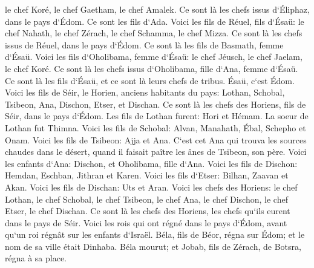 \verse le chef Koré, le chef Gaetham, le chef Amalek. Ce sont là les chefs issus d`Éliphaz, dans le pays d`Édom. Ce sont les fils d`Ada. 
\verse Voici les fils de Réuel, fils d`Ésaü: le chef Nahath, le chef Zérach, le chef Schamma, le chef Mizza. Ce sont là les chefs issus de Réuel, dans le pays d`Édom. Ce sont là les fils de Basmath, femme d`Ésaü. 
\verse Voici les fils d`Oholibama, femme d`Ésaü: le chef Jéusch, le chef Jaelam, le chef Koré. Ce sont là les chefs issus d`Oholibama, fille d`Ana, femme d`Ésaü. 
\verse Ce sont là les fils d`Ésaü, et ce sont là leurs chefs de tribus. Ésaü, c`est Édom. 
\verse Voici les fils de Séir, le Horien, anciens habitants du pays: Lothan, Schobal, Tsibeon, Ana, 
\verse Dischon, Etser, et Dischan. Ce sont là les chefs des Horiens, fils de Séir, dans le pays d`Édom. 
\verse Les fils de Lothan furent: Hori et Hémam. La soeur de Lothan fut Thimna. 
\verse Voici les fils de Schobal: Alvan, Manahath, Ébal, Schepho et Onam. 
\verse Voici les fils de Tsibeon: Ajja et Ana. C`est cet Ana qui trouva les sources chaudes dans le désert, quand il faisait paître les ânes de Tsibeon, son père. 
\verse Voici les enfants d`Ana: Dischon, et Oholibama, fille d`Ana. 
\verse Voici les fils de Dischon: Hemdan, Eschban, Jithran et Karen. 
\verse Voici les fils d`Etser: Bilhan, Zaavan et Akan. 
\verse Voici les fils de Dischan: Uts et Aran. 
\verse Voici les chefs des Horiens: le chef Lothan, le chef Schobal, le chef Tsibeon, le chef Ana, 
\verse le chef Dischon, le chef Etser, le chef Dischan. Ce sont là les chefs des Horiens, les chefs qu`ils eurent dans le pays de Séir. 
\verse Voici les rois qui ont régné dans le pays d`Édom, avant qu`un roi régnât sur les enfants d`Israël. 
\verse Béla, fils de Béor, régna sur Édom; et le nom de sa ville était Dinhaba. 
\verse Béla mourut; et Jobab, fils de Zérach, de Botsra, régna à sa place. 
